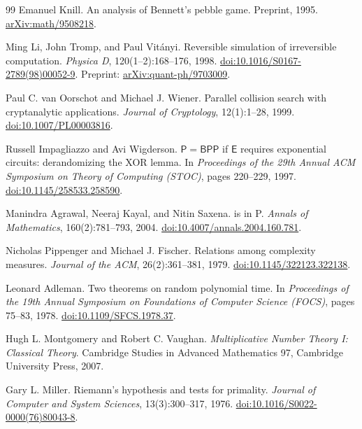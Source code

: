 \documentclass[11pt]{article}
\theoremstyle{definition}
\theoremstyle{remark}
\numberwithin{equation}{section}
\begin{document}
\begin{thebibliography}{99}
Emanuel Knill.
\newblock An analysis of Bennett's pebble game.
\newblock Preprint, 1995.
\newblock \href{https://arxiv.org/abs/math/9508218}{arXiv:math/9508218}.

Ming Li, John Tromp, and Paul Vit\'anyi.
\newblock Reversible simulation of irreversible computation.
\newblock \emph{Physica D}, 120(1--2):168--176, 1998.
\newblock \href{https://doi.org/10.1016/S0167-2789(98)00052-9}{doi:10.1016/S0167-2789(98)00052-9}.
\newblock Preprint: \href{https://arxiv.org/abs/quant-ph/9703009}{arXiv:quant-ph/9703009}.

Paul C. van Oorschot and Michael J. Wiener.
\newblock Parallel collision search with cryptanalytic applications.
\newblock \emph{Journal of Cryptology}, 12(1):1--28, 1999.
\newblock \href{https://doi.org/10.1007/PL00003816}{doi:10.1007/PL00003816}.

Russell Impagliazzo and Avi Wigderson.
\newblock $\mathsf{P}=\mathsf{BPP}$ if $\mathsf{E}$ requires exponential
circuits: derandomizing the {XOR} lemma.
\newblock In \emph{Proceedings of the 29th Annual ACM Symposium on Theory of
Computing (STOC)}, pages 220--229, 1997.
\newblock \href{https://doi.org/10.1145/258533.258590}{doi:10.1145/258533.258590}.

Manindra Agrawal, Neeraj Kayal, and Nitin Saxena.
 is in {P}.
\newblock \emph{Annals of Mathematics}, 160(2):781--793, 2004.
\newblock \href{https://doi.org/10.4007/annals.2004.160.781}{doi:10.4007/annals.2004.160.781}.

Nicholas Pippenger and Michael J. Fischer.
\newblock Relations among complexity measures.
\newblock \emph{Journal of the ACM}, 26(2):361--381, 1979.
\newblock \href{https://doi.org/10.1145/322123.322138}{doi:10.1145/322123.322138}.

Leonard Adleman.
\newblock Two theorems on random polynomial time.
\newblock In \emph{Proceedings of the 19th Annual Symposium on Foundations
of Computer Science (FOCS)}, pages 75--83, 1978.
\newblock \href{https://doi.org/10.1109/SFCS.1978.37}{doi:10.1109/SFCS.1978.37}.

Hugh L. Montgomery and Robert C. Vaughan.
\newblock \emph{Multiplicative Number Theory I: Classical Theory}.
\newblock Cambridge Studies in Advanced Mathematics 97, Cambridge
University Press, 2007.

Gary L. Miller.
\newblock Riemann's hypothesis and tests for primality.
\newblock \emph{Journal of Computer and System Sciences}, 13(3):300--317,
1976.
\newblock \href{https://doi.org/10.1016/S0022-0000(76)80043-8}{doi:10.1016/S0022-0000(76)80043-8}.


\end{thebibliography}
\end{document}
